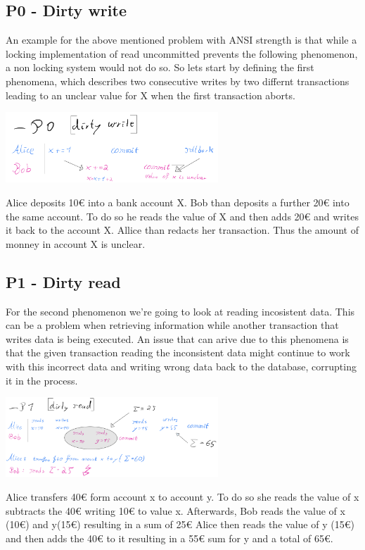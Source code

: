 \documentclass[sigconf, review=true]{acmart}
\begin{document}
\subsection{P0 - Dirty write}
An example for the above mentioned problem with ANSI strength is that while a locking implementation of read uncommitted
prevents the following phenomenon, a non locking system would not do so.
So lets start by defining the first phenomena, which describes two consecutive writes by two differnt
transactions leading to an unclear value for X when the first transaction aborts.

\includegraphics[width=8cm]{P0}

\begin{example}
    Alice deposits 10€ into a bank account X.
    Bob than deposits a further 20€ into the same account.
    To do so he reads the value of X and then adds 20€ and writes it back to the account X.
    Allice than redacts her transaction.
    Thus the amount of monney in account X is unclear.
\end{example}

\subsection{P1 - Dirty read}
For the second phenomenon we're going to look at reading incosistent data.
This can be a problem when retrieving information while another transaction
that writes data is being executed. An issue that can arive due to this phenomena is
that the given transaction reading the inconsistent data might continue to work with this
incorrect data and writing wrong data back to the database, corrupting it in the process.

\includegraphics[width=8cm]{P1}
\begin{example}
    Alice transfers 40€ form account x to account y.
    To do so she reads the value of x subtracts the 40€ writing 10€ to value x.
    Afterwards, Bob reads the value of x (10€) and y(15€) resulting in a sum of 25€
    Alice then reads the value of y (15€) and then adds the 40€ to it resulting in a 55€ sum for y
    and a total of 65€.
\end{example}
\end{document}
